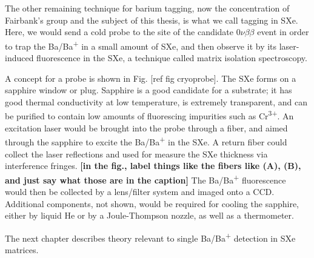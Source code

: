 The other remaining technique for barium tagging, now the concentration of Fairbank's group and the subject of this thesis, is what we call tagging in SXe.  Here, we would send a cold probe to the site of the candidate $0\nu\beta\beta$ event in order to trap the Ba/Ba\textsuperscript{+} in a small amount of SXe, and then observe it by its laser-induced fluorescence in the SXe, a technique called matrix isolation spectroscopy.

A concept for a probe is shown in Fig. [ref fig cryoprobe].  The SXe forms on a sapphire window or plug.  Sapphire is a good candidate for a substrate; it has good thermal conductivity at low temperature, is extremely transparent, and can be purified to contain low amounts of fluorescing impurities such as Cr\textsuperscript{3+}.  An excitation laser would be brought into the probe through a fiber, and aimed through the sapphire to excite the Ba/Ba\textsuperscript{+} in the SXe.  A return fiber could collect the laser reflections and used for measure the SXe thickness via interference fringes.  {\color{red}\textbf{[in the fig., label things like the fibers like (A), (B), and just say what those are in the caption]}}  The Ba/Ba\textsuperscript{+} fluorescence would then be collected by a lens/filter system and imaged onto a CCD.  Additional components, not shown, would be required for cooling the sapphire, either by liquid He or by a Joule-Thompson nozzle, as well as a thermometer.

The next chapter describes theory relevant to single Ba/Ba\textsuperscript{+} detection in SXe matrices.